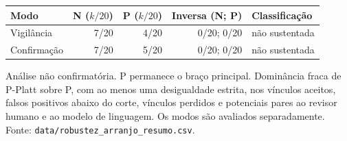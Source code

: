 \begin{tabular}{lrrrl}
\toprule
Modo & N ($k/20$) & P ($k/20$) & Inversa (N; P) & Classificação \\
\midrule
Vigilância & 7/20 & 4/20 & 0/20; 0/20 & não sustentada \\
Confirmação & 7/20 & 5/20 & 0/20; 0/20 & não sustentada \\
\bottomrule
\end{tabular}
\par\noindent\footnotesize Análise não confirmatória. P permanece o braço principal. Dominância fraca de P-Platt sobre P, com ao menos uma desigualdade estrita, nos vínculos aceitos, falsos positivos abaixo do corte, vínculos perdidos e potenciais pares ao revisor humano e ao modelo de linguagem. Os modos são avaliados separadamente. Fonte: \texttt{data/robustez\_arranjo\_resumo.csv}.
